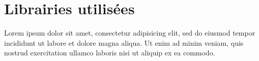 \documentclass[a4paper, oneside, english, 12pt, final]{extreport}
\begin{document}
\section{Librairies utilisées}
 
  Lorem ipsum dolor sit amet, consectetur adipisicing elit, sed do eiusmod
  tempor incididunt ut labore et dolore magna aliqua. Ut enim ad minim veniam,
  quis nostrud exercitation ullamco laboris nisi ut aliquip ex ea commodo.




%



\cleardoublepage%


\printglossaries
\printindex


\end{document}
